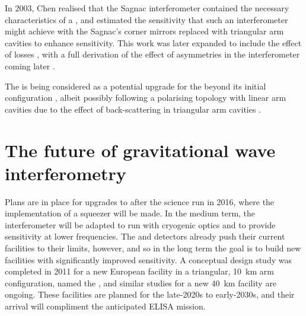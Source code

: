 In 2003, Chen realised that the Sagnac interferometer contained the necessary characteristics of a \SM{} \cite{Chen2003}, and estimated the sensitivity that such an interferometer might achieve with the Sagnac's corner mirrors replaced with triangular arm cavities to enhance sensitivity. This work was later expanded to include the effect of losses \cite{Danilishin2004}, with a full derivation of the effect of asymmetries in the interferometer coming later \cite{Danilishin2015}.

The \SSM{} is being considered as a potential upgrade for the \ET{} beyond its initial configuration \cite{Wang2013, Huttner2016}, albeit possibly following a polarising topology with linear arm cavities \cite{Danilishin2004} due to the effect of back-scattering in triangular arm cavities .

\section{The future of gravitational wave interferometry}
Plans are in place for upgrades to \ALIGO{} after the science run in 2016, where the implementation of a squeezer will be made. In the medium term, the interferometer will be adapted to run with cryogenic optics and to provide sensitivity at lower frequencies. The \ALIGO{} and \AVIRGO{} detectors already push their current facilities to their limits, however, and so in the long term the goal is to build new facilities with significantly improved sensitivity. A conceptual design study was completed in 2011 for a new European facility in a triangular, \SI{10}{\kilo\meter} arm configuration, named the \ET{}, and similar studies for a new \SI{40}{\kilo\meter} \LIGO{} facility are ongoing. These facilities are planned for the late-2020s to early-2030s, and their arrival will compliment the anticipated \gls{ELISA} mission.